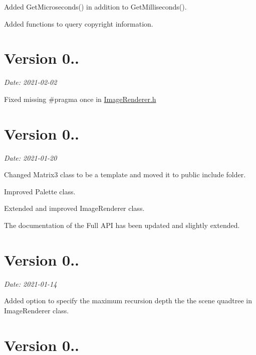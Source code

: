 \begin{DoxyItemize}
\item Added {\ttfamily Get\+Microseconds()} in addition to {\ttfamily Get\+Milliseconds()}.
\item Added functions to query copyright information.
\end{DoxyItemize}

\section*{Version 0..}

{\itshape Date\+: 2021-\/02-\/02}


\begin{DoxyItemize}
\item Fixed missing {\ttfamily \#pragma once} in \hyperlink{ImageRenderer_8h_source}{Image\+Renderer.\+h}
\end{DoxyItemize}

\section*{Version 0..}

{\itshape Date\+: 2021-\/01-\/20}


\begin{DoxyItemize}
\item Changed Matrix3 class to be a template and moved it to public include folder.
\item Improved {\ttfamily Palette} class.
\item Extended and improved {\ttfamily Image\+Renderer} class.
\item The documentation of the Full A\+PI has been updated and slightly extended.
\end{DoxyItemize}

\section*{Version 0..}

{\itshape Date\+: 2021-\/01-\/14}


\begin{DoxyItemize}
\item Added option to specify the maximum recursion depth the the scene quadtree in {\ttfamily Image\+Renderer} class.
\end{DoxyItemize}

\section*{Version 0..}

